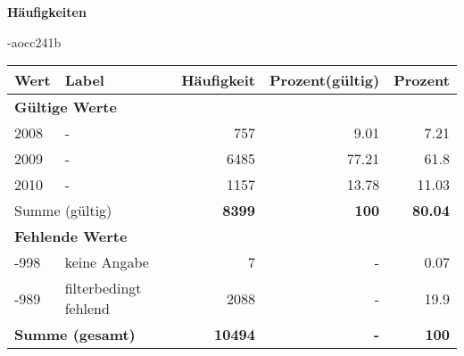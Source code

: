         		\vspace*{0.5cm}
                \noindent\textbf{Häufigkeiten}

                \vspace*{-\baselineskip}
					\begin{filecontents}{\jobname-aocc241b}
					\begin{longtable}{lXrrr}
					\toprule
					\textbf{Wert} & \textbf{Label} & \textbf{Häufigkeit} & \textbf{Prozent(gültig)} & \textbf{Prozent} \\
					\endhead
					\midrule
					\multicolumn{5}{l}{\textbf{Gültige Werte}}\\

					2008 &
					\multicolumn{1}{X}{ -  } &


					  \num{757} &
					  \num[round-mode=places,round-precision=2]{9,01} &
					    \num[round-mode=places,round-precision=2]{7,21} \\

					2009 &
					\multicolumn{1}{X}{ -  } &


					  \num{6485} &
					  \num[round-mode=places,round-precision=2]{77,21} &
					    \num[round-mode=places,round-precision=2]{61,8} \\

					2010 &
					\multicolumn{1}{X}{ -  } &


					  \num{1157} &
					  \num[round-mode=places,round-precision=2]{13,78} &
					    \num[round-mode=places,round-precision=2]{11,03} \\
					\midrule
					\multicolumn{2}{l}{Summe (gültig)} &
					  \textbf{\num{8399}} &
					\textbf{100} &
					  \textbf{\num[round-mode=places,round-precision=2]{80,04}} \\
					\multicolumn{5}{l}{\textbf{Fehlende Werte}}\\
							-998 &
							keine Angabe &
							  \num{7} &
							 - &
							  \num[round-mode=places,round-precision=2]{0,07} \\
							-989 &
							filterbedingt fehlend &
							  \num{2088} &
							 - &
							  \num[round-mode=places,round-precision=2]{19,9} \\
					\midrule
					\multicolumn{2}{l}{\textbf{Summe (gesamt)}} &
				      \textbf{\num{10494}} &
				    \textbf{-} &
				    \textbf{100} \\
					\bottomrule
					\end{longtable}
					\end{filecontents}
